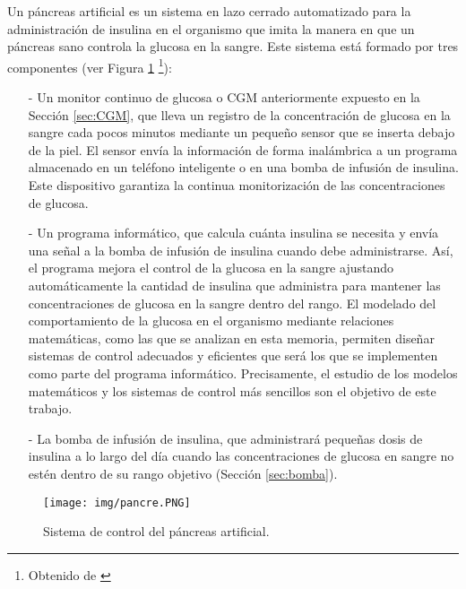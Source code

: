 Un páncreas artificial es un sistema en lazo cerrado automatizado para la administración de insulina en el organismo que imita la manera en que un páncreas sano controla la glucosa en la sangre.
Este sistema está formado por tres componentes (ver Figura \ref{fig:pancreas_art} \footnote{Obtenido de \cite{vibora2017pancreas}}):
\begin{enumerate}
    \item[-] Un monitor continuo de glucosa o CGM anteriormente expuesto en la Sección \ref{sec:CGM}, que  lleva un registro de la concentración de glucosa en la sangre cada pocos minutos mediante un pequeño sensor que se inserta debajo de la piel. El sensor envía la información de forma inalámbrica a un programa almacenado en un teléfono inteligente o en una bomba de infusión de insulina. Este dispositivo garantiza la continua monitorización de las concentraciones de glucosa.
    \item[-] Un programa informático, que calcula cuánta insulina se necesita y envía una señal a la bomba de infusión de insulina cuando debe administrarse. Así, el programa mejora el control de la glucosa en la sangre ajustando automáticamente la cantidad de insulina que administra para mantener las concentraciones de glucosa en la sangre dentro del rango. El modelado del comportamiento de la glucosa en el organismo mediante relaciones matemáticas, como las que se analizan en esta memoria, permiten diseñar sistemas de control adecuados y eficientes que será los que se implementen como parte del programa informático. Precisamente, el estudio de los modelos matemáticos y los sistemas de control más sencillos son el objetivo de este trabajo.
    \item[-]  La bomba de infusión de insulina, que administrará pequeñas dosis de insulina a lo largo del día cuando las concentraciones de glucosa en sangre no estén dentro de su rango objetivo (Sección \ref{sec:bomba}).
\end{enumerate}

\begin{figure}
    \centering
    \texttt{[image: img/pancre.PNG]}
    \caption{Sistema de control del páncreas artificial.}
    \label{fig:pancreas_art}
\end{figure}

